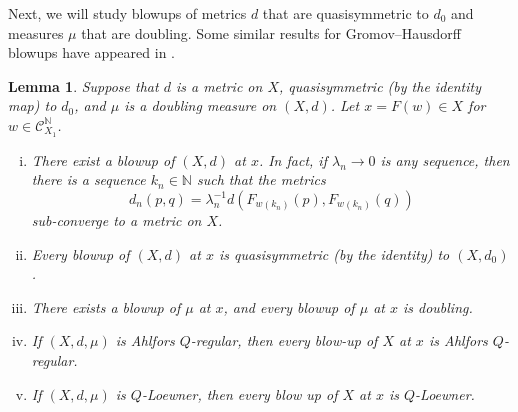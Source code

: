 \documentclass{amsart}
\theoremstyle{plain}
\newtheorem{lemma}[theorem]{Lemma}
\theoremstyle{definition}
\numberwithin{equation}{section}
\numberwithin{theorem}{section}
\newcommand{\N}{\mathbb{N}}
\newcommand{\cC}{\mathcal{C}}
\begin{document}
Next, we will study blowups of metrics $d$ that are quasisymmetric to $d_0$ and measures $\mu$ that are doubling.  Some similar results for Gromov--Hausdorff blowups have appeared in \cite{angela,Wenbo,MT}. 

\begin{lemma}\label{lem:blowup}
Suppose that $d$ is a metric on $X$, quasisymmetric (by the identity map) to $d_0$, and $\mu$ is a doubling measure on $(X,d)$. Let $x=F(w)\in X$ for $w\in \cC_{X_1}^\N$. 

\begin{enumerate}[(i)]
\item\label{item:blowupd} There exist a blowup of $(X,d)$ at $x$. In fact, if $\lambda_n\rightarrow 0$ is any sequence, then there is a sequence $k_n\in \mathbb{N}$ such that the metrics
\begin{equation}\label{eq:dn}
d_n(p,q)= \lambda_n^{-1}d(F_{w(k_n)}(p),F_{w(k_n)}(q)) 
\end{equation}
sub-converge to a metric on $X$.

\item\label{item:blowupqs} Every blowup of $(X,d)$ at $x$ is quasisymmetric (by the identity) to $(X,d_0)$. 

\item\label{item:blowupmu}There exists a blowup of $\mu$ at $x$, and every blowup of $\mu$ at $x$ is doubling.

\item\label{item:blowupAR} If $(X,d,\mu)$ is Ahlfors $Q$-regular, then every blow-up of $X$ at $x$ is Ahlfors $Q$-regular.

\item\label{item:blowuploewner} If $(X,d,\mu)$ is $Q$-Loewner, then every blow up of $X$ at $x$ is $Q$-Loewner.
\end{enumerate}
\end{lemma}
\end{document}
